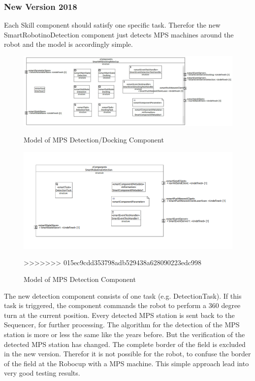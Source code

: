 \subsubsection{ New Version 2018}

Each Skill component should satisfy one specific task. Therefor the new SmartRobotinoDetection component just detects MPS machines around the robot and the model is accordingly simple.

\begin{figure}[h]
\centering
\includegraphics[scale=0.4]{pic/SmartMPSDockingRoboCup.jpg}
\caption{Model of MPS Detection/Docking Component}
\label{fig:dockingold_overview}
\includegraphics[scale=0.4]{pic/detectionComponent.png}
\caption{Model of MPS Detection Component}
\label{fig:dockingNew_overview}
>>>>>>> 015ec9cdd353798adb529438a628090223edc998
\end{figure}

The new detection component consists of one task (e.g. DetectionTask). If this task is triggered, the component commands the robot to perform a 360 degree turn at the current position. Every detected MPS station is sent back to the Sequencer, for further processing. 
The algorithm for the detection of the MPS station is more or less the same like the years before. But the verification of the detected MPS station has changed. The complete border of the field is excluded in the new version. Therefor it is not possible for the robot, to confuse the border of the field at the Robocup with a MPS machine. This simple approach lead into very good testing results. 

